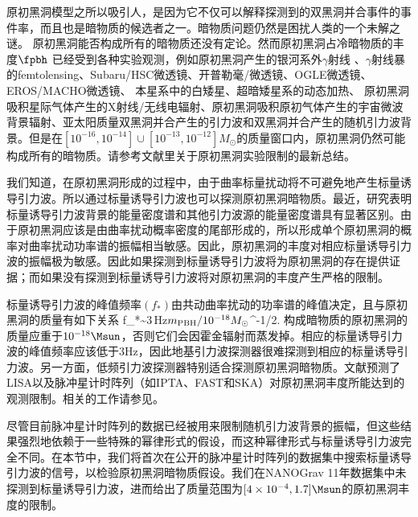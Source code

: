 原初黑洞模型之所以吸引人，是因为它不仅可以解释\lvc 探测到的双黑洞并合事件的事件率，而且也是暗物质的候选者之一。暗物质问题仍然是困扰人类的一个未解之谜。
原初黑洞能否构成所有的暗物质还没有定论。然而原初黑洞占冷暗物质的丰度$\fpbh$
已经受到各种实验观测，例如原初黑洞产生的银河系外$\gamma$射线 \cite{Carr:2009jm}、$\gamma$射线暴的femtolensing\cite{Barnacka:2012bm}、Subaru/HSC微透镜\cite{Niikura:2017zjd}、开普勒毫/微透镜\cite{Griest:2013esa}、OGLE微透镜\cite{Niikura:2019kqi}、EROS/MACHO微透镜\cite{Tisserand:2006zx}、
本星系中的白矮星\cite{Graham:2015apa}、超暗矮星系的动态加热\cite{Brandt:2016aco}、
原初黑洞吸积星际气体产生的X射线/无线电辐射\cite{Gaggero:2016dpq}、原初黑洞吸积原初气体产生的宇宙微波背景辐射\cite{Ali-Haimoud:2016mbv,Blum:2016cjs,Horowitz:2016lib,Chen:2016pud}、亚太阳质量双黑洞并合产生的引力波\cite{Abbott:2018oah,Magee:2018opb,Chen:2019irf,Authors:2019qbw}和双黑洞并合产生的随机引力波背景\cite{Wang:2016ana,Chen:2019irf}。但是在$[10^{-16},10^{-14}] \cup [10^{-13},10^{-12}] M_\odot$的质量窗口内，原初黑洞仍然可能构成所有的暗物质。请参考文献\cite{Chen:2019irf}里关于原初黑洞实验限制的最新总结。

我们知道，在原初黑洞形成的过程中，由于曲率标量扰动将不可避免地产生标量诱导引力波。所以通过标量诱导引力波也可以探测原初黑洞暗物质。最近，研究表明标量诱导引力波背景的能量密度谱和其他引力波源的能量密度谱具有显著区别\cite{Yuan:2019wwo}。由于原初黑洞应该是由曲率扰动概率密度的尾部形成的，所以形成单个原初黑洞的概率对曲率扰动功率谱的振幅相当敏感\cite{Young:2014ana}。因此，原初黑洞的丰度对相应标量诱导引力波的振幅极为敏感。因此如果探测到标量诱导引力波将为原初黑洞的存在提供证据；而如果没有探测到标量诱导引力波将对原初黑洞的丰度产生严格的限制。


标量诱导引力波的峰值频率$(f_*)$由共动曲率扰动的功率谱的峰值决定，且与原初黑洞的质量有如下关系\cite{Saito:2008jc}
\e
f_*\sim 3\,{\rm{Hz}}\({m_{\rm{PBH}}/10^{-18} M_\odot}\)^{-1/2}.
\q
构成暗物质的原初黑洞的质量应重于$10^{-18}\Msun$，否则它们会因霍金辐射而蒸发掉。相应的标量诱导引力波的峰值频率应该低于$3$Hz，因此地基引力波探测器很难探测到相应的标量诱导引力波。另一方面，低频引力波探测器特别适合探测原初黑洞暗物质。文献\cite{Yuan:2019udt}预测了LISA\cite{Audley:2017drz}以及脉冲星计时阵列（如IPTA\cite{Hobbs:2009yy}、FAST\cite{Nan:2011um}和SKA\cite{Kramer:2015jsa}）对原初黑洞丰度所能达到的观测限制。相关的工作请参见\cite{Inomata:2016rbd,Schutz:2016khr,Orlofsky:2016vbd,Dror:2019twh,Wang:2019kaf,Cai:2019elf,Clesse:2018ogk}。

尽管目前脉冲星计时阵列的数据已经被用来限制随机引力波背景的振幅，但这些结果强烈地依赖于一些特殊的幂律形式的假设，而这种幂律形式与标量诱导引力波完全不同\cite{Yuan:2019udt}。在本节中，我们将首次在公开的脉冲星计时阵列的数据集中搜索标量诱导引力波的信号，以检验原初黑洞暗物质假设。我们在NANOGrav 11年数据集中未探测到标量诱导引力波，进而给出了质量范围为$[4\times 10^{-4}, 1.7]\Msun$的原初黑洞丰度的限制。

